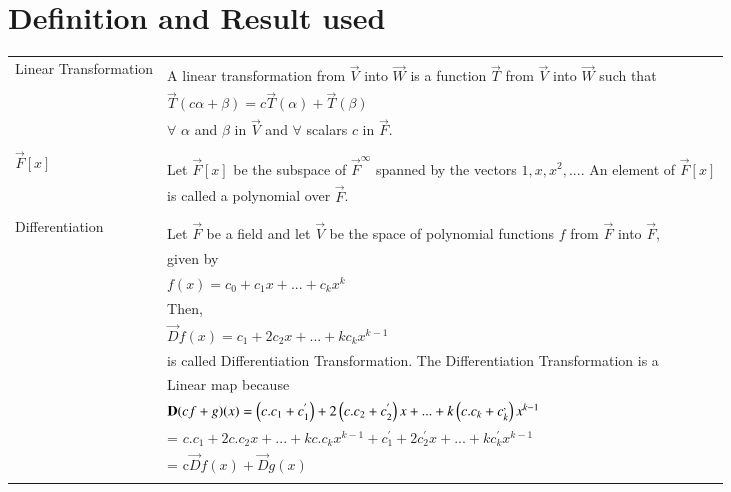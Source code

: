 \documentclass[journal,12pt,twocolumn]{IEEEtran}
\newcommand\myemptypage{
	\null
	\thispagestyle{empty}
	\addtocounter{page}{-1}
	\newpage
}
\begin{document}
\section{Definition and Result used}
\pagebreak
\myemptypage
\begin{table}[hp]
	\begin{tabular}{|l|l|}
	\hline
	\multirow{3}{*}{Linear Transformation} & \\
	& A linear transformation from $\vec{V}$ into $\vec{W}$ is a function $\vec{T}$ from $\vec{V}$ into $\vec{W}$ such that \\
	& \qquad \qquad \qquad \qquad \qquad $\vec{T}(c\alpha + \beta) = c\vec{T}(\alpha) + \vec{T}(\beta)$  \\
	& $\forall$ $\alpha$ and $\beta$ in $\vec{V}$ and $\forall$ scalars $c$ in $\vec{F}$. \\
	& \\
	\hline
	\multirow{3}{*}{\qquad \qquad $\vec{F}[x]$} & \\
	& Let $\vec{F}[x]$ be the subspace of $\vec{F}^{\infty}$ spanned by the vectors $1, x, x^2,...$. An element of $\vec{F}[x]$ \\
	& is called a polynomial over $\vec{F}$. \\
	& \\
	\hline
	\multirow{3}{*}{\qquad Differentiation} & \\
	& Let $\vec{F}$ be a field and let $\vec{V}$ be the space of polynomial functions $f$ from $\vec{F}$ into $\vec{F}$,\\
\qquad Transformation & given by \\
    & \qquad \qquad \qquad  $f(x) = c_0 + c_1x + . . . + c_kx^k$\\  
    & Then,\\
    &\qquad \qquad \qquad $\vec{D}f(x) = c_1 + 2c_2x + ...+ kc_kx^{k-1} $\\
    & is called Differentiation Transformation. The Differentiation Transformation is a \\
	& Linear map because \\
	& \qquad \qquad \qquad $\mathbf{D}(cf+g)(x) = \left(c.c_1 + c_1^{'}\right) + 2\left(c.c_2 + c_2^{'}\right)x + ... + k\left(c.c_k + c_k^{,}\right)x^{k-1}$ \\
    & \qquad \qquad \qquad \qquad \qquad \qquad = $c.c_1 + 2c.c_2x + ... + kc.c_kx^{k-1} + c_1^{'} + 2c_2^{'}x + ... + kc_k^{'}x^{k-1}$ \\	
    & \qquad \qquad \qquad \qquad \qquad \qquad = c$\vec{D}f(x) + \vec{D}g(x)$\\
    &\\
    \hline
\end{tabular}
\end{table}
\end{document}

